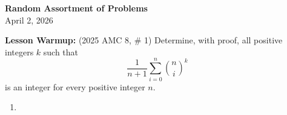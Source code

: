 \documentclass[a4paper]{article}
\begin{document}
\begin{center}
{\Large\bfseries Random Assortment of Problems}\\[0.25cm]
{\large April 2, 2026}\\[1cm]
\end{center}

\noindent \textbf{Lesson Warmup:} (2025 AMC 8, \# 1) Determine, with proof, all positive integers $k$ such that\[\frac{1}{n+1} \sum_{i=0}^n \binom{n}{i}^k\]is an integer for every positive integer $n.$

\vspace{.5cm}

\begin{enumerate}[itemsep=2cm]
    \item 
    
\end{enumerate}
\end{document}
